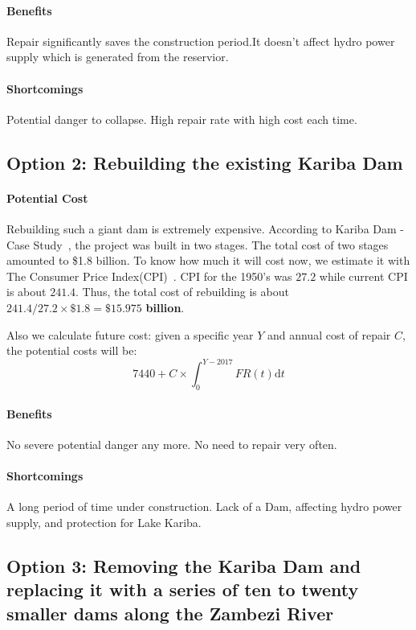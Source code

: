 \documentclass{mcmthesis}
\begin{document}
\paragraph{Benefits}
Repair significantly saves the construction period.It doesn't affect hydro power supply which is generated from the reservior.
\paragraph{Shortcomings}
Potential danger to collapse. High repair rate with high cost each time.
\subsection*{Option 2: Rebuilding the existing Kariba Dam}
\paragraph{Potential Cost}
Rebuilding such a giant dam is extremely expensive. According to Kariba Dam - Case Study~\cite{WCD_Dam}, the project was built in two stages. The total cost of two stages amounted to \$1.8 billion. To know how much it will cost now, we estimate it with The Consumer Price Index(CPI)~\cite{mankiw2014principles}. CPI for the 1950's was $27.2$ while current CPI is about $241.4$. Thus, the total cost of rebuilding is about $241.4/ 27.2 \times \$1.8 = \mathbf{\$15.975}$ \textbf{billion}.

Also we calculate future cost: given a specific year $Y$ and annual cost of repair $C$, the potential costs will be:
\begin{equation}
\label{eq:FR4}
7440+C\times\int_0^{Y-2017} FR(t)\mathrm{d}t
\end{equation}
\paragraph{Benefits}
No severe potential danger any more. No need to repair very often.
\paragraph{Shortcomings}
A long period of time under construction. Lack of a Dam, affecting hydro power supply, and protection for Lake Kariba.
\subsection*{Option 3: Removing the Kariba Dam and replacing it with a series of ten to twenty smaller dams along the Zambezi River}
\end{document}

